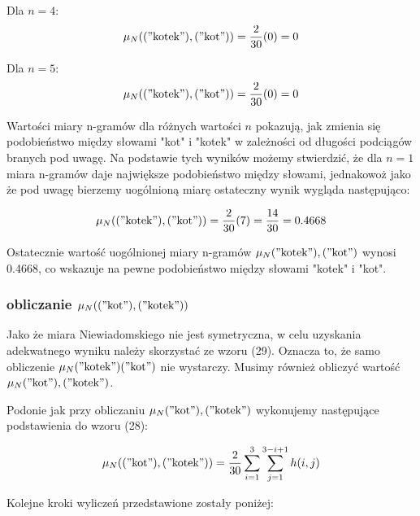 \documentclass{article}
\begin{document}
Dla $n = 4$:
\begin{equation}
    \mu_N(("\text{kotek}"), ("\text{kot}")) = \frac{2}{30} (0) = 0
\end{equation}

Dla $n = 5$:
\begin{equation}
    \mu_N(("\text{kotek}"), ("\text{kot}")) = \frac{2}{30} (0) = 0
\end{equation}

\noindent Wartości miary n-gramów dla różnych wartości \( n \) pokazują, jak zmienia się podobieństwo między słowami "kot" i "kotek" w zależności od długości podciągów branych pod uwagę. Na podstawie tych wyników możemy stwierdzić, że dla \( n = 1 \) miara n-gramów daje największe podobieństwo między słowami, jednakowoż jako że pod uwagę bierzemy uogólnioną miarę ostateczny wynik wygląda następująco:


\begin{equation}
\mu_N(("\text{kotek}"), ("\text{kot}")) = \frac{2}{30} (7) = \frac{14}{30} = 0.4668
\end{equation}

\noindent Ostatecznie wartość uogólnionej miary n-gramów \( \mu_N("\text{kotek}"), ("\text{kot}") \) wynosi 0.4668, co wskazuje na pewne podobieństwo między słowami "kotek" i "kot". \newline


\subsubsection*{obliczanie \( \mu_N(("\text{kot}"), ("\text{kotek}")) \)}

\noindent Jako że miara Niewiadomskiego nie jest symetryczna, w celu uzyskania adekwatnego wyniku należy skorzystać ze wzoru (29). Oznacza to, że samo obliczenie \( \mu_N("\text{kotek}")("\text{kot}") \) nie wystarczy. Musimy również obliczyć wartość \( \mu_N("\text{kot}"), ("\text{kotek}") \). \newline

\noindent Podonie jak przy obliczaniu \( \mu_N("\text{kot}"), ("\text{kotek}") \) wykonujemy następujące podstawienia do wzoru (28):

\begin{equation}
    \mu_N(("\text{kot}"), ("\text{kotek}")) = \frac{2}{30} \sum_{i=1}^{3} \sum_{j=1}^{3-i+1} h(i, j)
\end{equation}

\noindent Kolejne kroki wyliczeń przedstawione zostały poniżej: \newline
\end{document}

